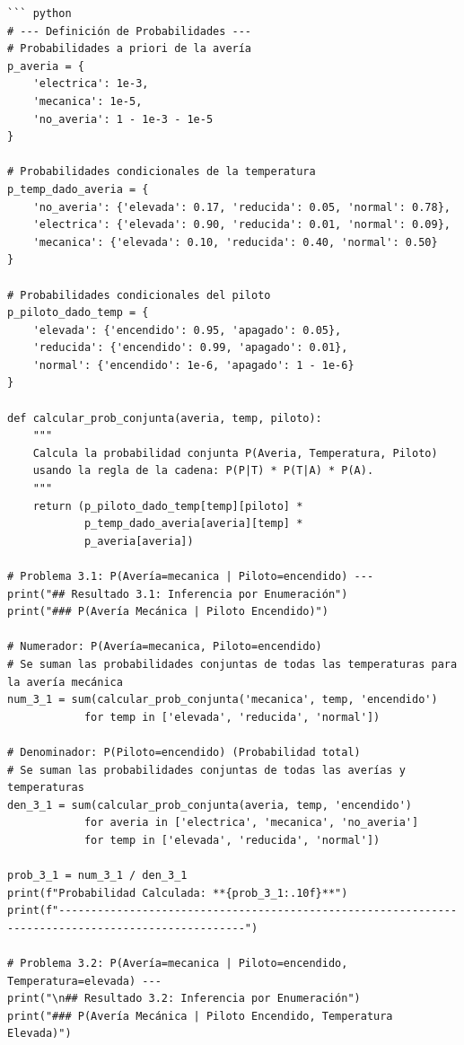 \documentclass[11pt]{article}
\makeatletter
\newcommand{\boxspacing}{\kern\kvtcb@left@rule\kern\kvtcb@boxsep}
\newcommand{\prompt}[4]{
        {\ttfamily\llap{{\color{#2}[#3]:\hspace{3pt}#4}}\vspace{-\baselineskip}}
    }
\makeatother
\begin{document}
\begin{tcolorbox}[breakable, size=fbox, boxrule=1pt, pad at break*=1mm, colback=cellbackground, colframe=cellborder]
\prompt{In}{incolor}{6}{\boxspacing}
\begin{Verbatim}[commandchars=\\\{\}]
``` python
# --- Definición de Probabilidades ---
# Probabilidades a priori de la avería
p_averia = {
    'electrica': 1e-3,
    'mecanica': 1e-5,
    'no_averia': 1 - 1e-3 - 1e-5
}

# Probabilidades condicionales de la temperatura
p_temp_dado_averia = {
    'no_averia': {'elevada': 0.17, 'reducida': 0.05, 'normal': 0.78},
    'electrica': {'elevada': 0.90, 'reducida': 0.01, 'normal': 0.09},
    'mecanica': {'elevada': 0.10, 'reducida': 0.40, 'normal': 0.50}
}

# Probabilidades condicionales del piloto
p_piloto_dado_temp = {
    'elevada': {'encendido': 0.95, 'apagado': 0.05},
    'reducida': {'encendido': 0.99, 'apagado': 0.01},
    'normal': {'encendido': 1e-6, 'apagado': 1 - 1e-6}
}

def calcular_prob_conjunta(averia, temp, piloto):
    """
    Calcula la probabilidad conjunta P(Averia, Temperatura, Piloto)
    usando la regla de la cadena: P(P|T) * P(T|A) * P(A).
    """
    return (p_piloto_dado_temp[temp][piloto] *
            p_temp_dado_averia[averia][temp] *
            p_averia[averia])

# Problema 3.1: P(Avería=mecanica | Piloto=encendido) ---
print("## Resultado 3.1: Inferencia por Enumeración")
print("### P(Avería Mecánica | Piloto Encendido)")

# Numerador: P(Avería=mecanica, Piloto=encendido)
# Se suman las probabilidades conjuntas de todas las temperaturas para la avería mecánica
num_3_1 = sum(calcular_prob_conjunta('mecanica', temp, 'encendido')
            for temp in ['elevada', 'reducida', 'normal'])

# Denominador: P(Piloto=encendido) (Probabilidad total)
# Se suman las probabilidades conjuntas de todas las averías y temperaturas
den_3_1 = sum(calcular_prob_conjunta(averia, temp, 'encendido')
            for averia in ['electrica', 'mecanica', 'no_averia']
            for temp in ['elevada', 'reducida', 'normal'])

prob_3_1 = num_3_1 / den_3_1
print(f"Probabilidad Calculada: **{prob_3_1:.10f}**")
print(f"---------------------------------------------------------------------------------------------------")

# Problema 3.2: P(Avería=mecanica | Piloto=encendido, Temperatura=elevada) ---
print("\n## Resultado 3.2: Inferencia por Enumeración")
print("### P(Avería Mecánica | Piloto Encendido, Temperatura Elevada)")


\end{Verbatim}
\end{tcolorbox}
\end{document}
